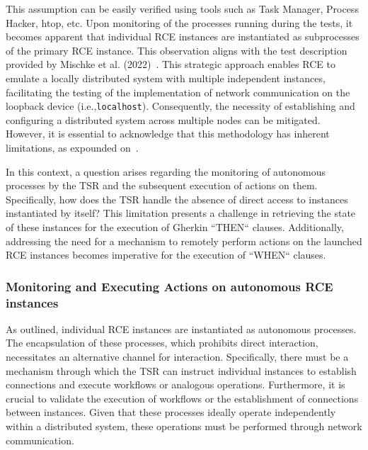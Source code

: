 This assumption can be easily verified using tools such as Task Manager, Process Hacker, htop, etc. Upon monitoring of the processes running during the tests, it becomes apparent that individual \ac{RCE} instances are instantiated as subprocesses of the primary \ac{RCE} instance. This observation aligns with the test description provided by Mischke et al. (2022)~\cite{10.1007/978-3-031-08760-8_44}. This strategic approach enables \ac{RCE} to emulate a locally distributed system with multiple independent instances, facilitating the testing of the implementation of network communication on the loopback device (i.e.,\texttt{localhost}). Consequently, the necessity of establishing and configuring a distributed system across multiple nodes can be mitigated. However, it is essential to acknowledge that this methodology has inherent limitations, as expounded on~.

In this context, a question arises regarding the monitoring of autonomous processes by the \ac{TSR} and the subsequent execution of actions on them. Specifically, how does the \ac{TSR} handle the absence of direct access to instances instantiated by itself? This limitation presents a challenge in retrieving the state of these instances for the execution of Gherkin ``THEN`` clauses. Additionally, addressing the need for a mechanism to remotely perform actions on the launched RCE instances becomes imperative for the execution of ``WHEN`` clauses.

\subsubsection{Monitoring and Executing Actions on autonomous RCE instances}
As outlined, individual RCE instances are instantiated as autonomous processes. The encapsulation of these processes, which prohibits direct interaction, necessitates an alternative channel for interaction. Specifically, there must be a mechanism through which the \ac{TSR} can instruct individual instances to establish connections and execute workflows or analogous operations. Furthermore, it is crucial to validate the execution of workflows or the establishment of connections between instances. Given that these processes ideally operate independently within a distributed system, these operations must be performed through network communication.

